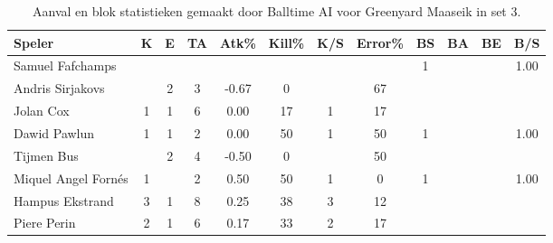 \begin{table}[ht!]
  \centering
  \scriptsize
  \begin{tabular}{|l|c|c|c|c|c|c|c|c|c|c|c|} \hline
    \textbf{Speler} &  K & E & TA & Atk\% & Kill\% & K/S & Error\% & BS & BA & BE & B/S \\ \hline
    Samuel Fafchamps &   &   &   &   &   &   &   & 1 &  & & 1.00 \\
    Andris Sirjakovs &  & 2 & 3 & -0.67 & 0 &  & 67 &   &  &  & \\
    Jolan Cox & 1 & 1 & 6 & 0.00 & 17 & 1 & 17 &  &  &  & \\
    Dawid Pawlun & 1 & 1 & 2 & 0.00 & 50 & 1 & 50 & 1 &  &  & 1.00 \\
    Tijmen Bus &  & 2 & 4 & -0.50 & 0 &  & 50 & &  &  &  \\
    Miquel Angel Fornés & 1 &  & 2 & 0.50 & 50 & 1 & 0 & 1 & & & 1.00 \\
    Hampus Ekstrand & 3 & 1 & 8 & 0.25 & 38 & 3 & 12 &   &   &  & \\
    Piere Perin & 2 & 1 & 6 & 0.17 & 33 & 2 & 17 &  &  & &  \\ \hline
  \end{tabular}
  \caption[Aanvals- en blokstatistieken gemaakt door Balltime AI voor Greenyard Maaseik in set 3]{\label{tab:PL1AttBlockMaaseikAI3}Aanval en blok statistieken gemaakt door Balltime AI voor Greenyard Maaseik in set 3.}
\end{table}

